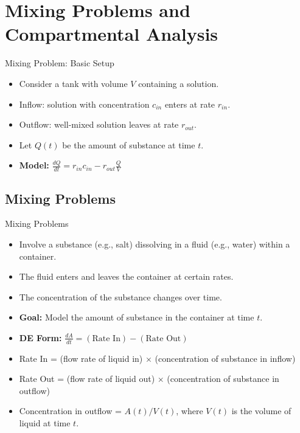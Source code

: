 \documentclass[10pt,aspectratio=169]{beamer}
\begin{document}
\section{Mixing Problems and Compartmental Analysis}
\begin{frame}{Mixing Problem: Basic Setup}
    \begin{itemize}
        \item Consider a tank with volume $V$ containing a solution.
        \item Inflow: solution with concentration $c_{in}$ enters at rate $r_{in}$.
        \item Outflow: well-mixed solution leaves at rate $r_{out}$.
        \item Let $Q(t)$ be the amount of substance at time $t$.
        \item \textbf{Model:} $\frac{dQ}{dt} = r_{in}c_{in} - r_{out}\frac{Q}{V}$
    \end{itemize}
\end{frame}

\subsection{Mixing Problems}
\begin{frame}{Mixing Problems}
    \begin{itemize}
        \item Involve a substance (e.g., salt) dissolving in a fluid (e.g., water) within a container.
        \item The fluid enters and leaves the container at certain rates.
        \item The concentration of the substance changes over time.
        \item \textbf{Goal:} Model the amount of substance in the container at time $t$.
        \item \textbf{DE Form:} $\frac{dA}{dt} = (\text{Rate In}) - (\text{Rate Out})$
        \item Rate In = (flow rate of liquid in) $\times$ (concentration of substance in inflow)
        \item Rate Out = (flow rate of liquid out) $\times$ (concentration of substance in outflow)
        \item Concentration in outflow = $A(t) / V(t)$, where $V(t)$ is the volume of liquid at time $t$.
    \end{itemize}
\end{frame}
\end{document}
